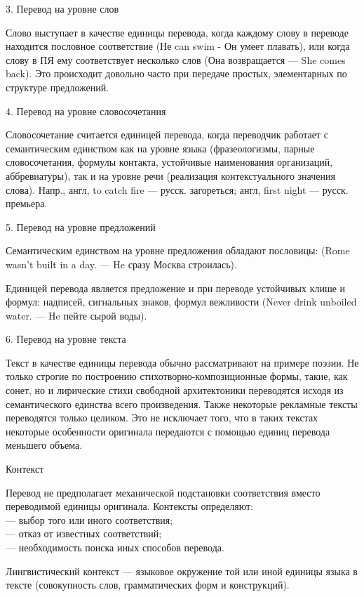3. Перевод на уровне слов

Слово выступает в качестве единицы перевода, когда каждому слову в переводе находится пословное соответствие (Не can swim - Он умеет плавать), или когда слову в ПЯ ему соответствует несколько слов (Она возвращается --- She comes back). Это происходит довольно часто при передаче простых, элементарных по структуре предложений.

4. Перевод на уровне словосочетания

Словосочетание считается единицей перевода, когда переводчик работает с семантическим единством как на уровне языка (фразеологизмы, парные словосочетания, формулы контакта, устойчивые наименования организаций, аббревиатуры), так и на уровне речи (реализация контекстуального значения слова). Напр., англ, to catch fire --- русск. загореться; англ, first night --- русск. премьера. 

5. Перевод на уровне предложений

Семантическим единством на уровне предложения обладают пословицы: (Rome wasn't built in a day. --- He сразу Москва строилась).

Единицей перевода является предложение и при переводе устойчивых клише и формул: надписей, сигнальных знаков, формул вежливости (Never drink unboiled water. --- He пейте сырой воды).

6. Перевод на уровне текста

Текст в качестве единицы перевода обычно рассматривают на примере поэзии. Не только строгие по построению стихотворно-композиционные формы, такие, как сонет, но и лирические стихи свободной архитектоники переводятся исходя из семантического единства всего произведения. Также некоторые рекламные тексты переводятся только целиком. Это не исключает того, что в таких текстах некоторые особенности оригинала передаются с помощью единиц перевода меньшего объема.

Контекст

Перевод не предполагает механической подстановки соответствия вместо переводимой единицы оригинала. Контексты определяют:
\\
--- выбор того или иного соответствия;
\\
--- отказ от известных соответствий;
\\
--- необходимость поиска иных способов перевода.

Лингвистический контекст --- языковое окружение той или иной единицы языка в тексте (совокупность слов, грамматических форм и конструкций).

